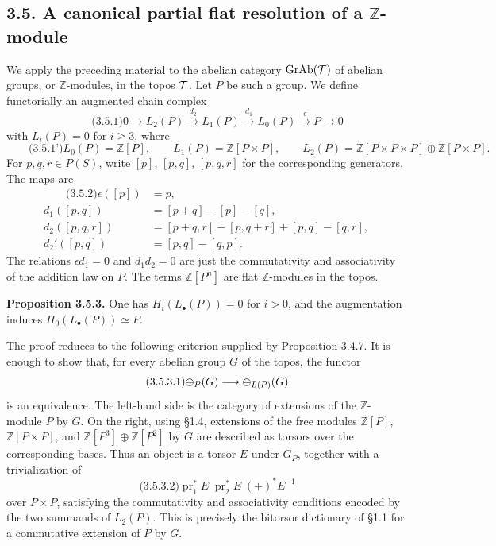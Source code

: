 \documentclass[11pt]{article}
\providecommand{\Z}{\mathbb Z}
\providecommand{\pr}{\operatorname{pr}}
\begin{document}
\subsection*{3.5. A canonical partial flat resolution of a \(\Z\)-module}
We apply the preceding material to the abelian category \(\operatorname{GrAb}(\mathcal T)\) of abelian groups, or \(\Z\)-modules, in the topos \(\mathcal T\).  Let \(P\) be such a group.  We define functorially an augmented chain complex
\begin{equation}\qquad\text{(3.5.1)}
  0\longrightarrow L_2(P)\xrightarrow{d_2}L_1(P)\xrightarrow{d_1}L_0(P)\xrightarrow{\epsilon}P\longrightarrow0
\end{equation}
with \(L_i(P)=0\) for \(i\geq3\), where
\begin{equation}\qquad\text{(3.5.1')}
  L_0(P)=\Z[P],\qquad
  L_1(P)=\Z[P\times P],\qquad
  L_2(P)=\Z[P\times P\times P]\oplus\Z[P\times P].
\end{equation}
For \(p,q,r\in P(S)\), write \([p]\), \([p,q]\), \([p,q,r]\) for the corresponding generators.  The maps are
\begin{align}\qquad\text{(3.5.2)}
 \epsilon([p])&=p,\\
 d_1([p,q])&=[p+q]-[p]-[q],\\
 d_2([p,q,r])&=[p+q,r]-[p,q+r]+[p,q]-[q,r],\\
 d_2'([p,q])&=[p,q]-[q,p].
\end{align}
The relations \(\epsilon d_1=0\) and \(d_1 d_2=0\) are just the commutativity and associativity of the addition law on \(P\).  The terms \(\Z[P^n]\) are flat \(\Z\)-modules in the topos.

\textbf{Proposition 3.5.3.}  One has \(H_i(L_\bullet(P))=0\) for \(i>0\), and the augmentation induces \(H_0(L_\bullet(P))\simeq P\).

The proof reduces to the following criterion supplied by Proposition 3.4.7.  It is enough to show that, for every abelian group \(G\) of the topos, the functor
\begin{equation}\qquad\text{(3.5.3.1)}
  \mathcal\Psi_P(G)\longrightarrow \mathcal\Psi_{L(P)}(G)
\end{equation}
is an equivalence.  The left-hand side is the category of extensions of the \(\Z\)-module \(P\) by \(G\).  On the right, using \S1.4, extensions of the free modules \(\Z[P]\), \(\Z[P\times P]\), and \(\Z[P^3]\oplus\Z[P^2]\) by \(G\) are described as torsors over the corresponding bases.  Thus an object is a torsor \(E\) under \(G_P\), together with a trivialization of
\begin{equation}\qquad\text{(3.5.3.2)}
  \pr_1^*E\;\pr_2^*E\;(+)^*E^{-1}
\end{equation}
over \(P\times P\), satisfying the commutativity and associativity conditions encoded by the two summands of \(L_2(P)\).  This is precisely the bitorsor dictionary of \S1.1 for a commutative extension of \(P\) by \(G\).
\end{document}
